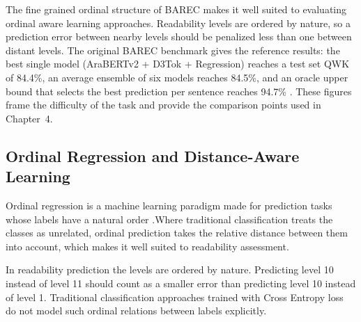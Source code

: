 \documentclass[12pt]{report}
\begin{document}
The fine grained ordinal structure of BAREC makes it well suited to evaluating ordinal aware learning approaches. Readability levels are ordered by nature, so a prediction error between nearby levels should be penalized less than one between distant levels. The original BAREC benchmark gives the reference results: the best single model (AraBERTv2 + D3Tok + Regression) reaches a test set QWK  of 84.4\%, an average ensemble of six models reaches 84.5\%, and an oracle upper bound that selects the best prediction per sentence reaches 94.7\% \cite{elmadani2025barec}. These figures frame the difficulty of the task and provide the comparison points used in Chapter~4.
\subsection{Ordinal Regression and Distance-Aware Learning}

Ordinal regression is a machine learning paradigm made for prediction tasks whose labels have a natural order \cite{gutierrez2016ordinal}.Where traditional classification treats the classes as unrelated, ordinal prediction takes the relative distance between them into account, which makes it well suited to readability assessment.

In readability prediction the levels are ordered by nature. Predicting level 10 instead of level 11 should count as a smaller error than predicting level 10 instead of level 1. Traditional classification approaches trained with Cross Entropy loss do not model such ordinal relations between labels explicitly.
\end{document}
